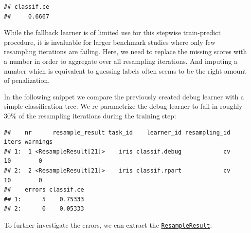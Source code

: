 \documentclass[
]{scrbook}
\newenvironment{Shaded}{\begin{snugshade}}{\end{snugshade}}
\newcommand{\AttributeTok}[1]{\textcolor[rgb]{0.77,0.63,0.00}{#1}}
\newcommand{\ConstantTok}[1]{\textcolor[rgb]{0.00,0.00,0.00}{#1}}
\newcommand{\FloatTok}[1]{\textcolor[rgb]{0.00,0.00,0.81}{#1}}
\newcommand{\FunctionTok}[1]{\textcolor[rgb]{0.00,0.00,0.00}{#1}}
\newcommand{\NormalTok}[1]{#1}
\newcommand{\OtherTok}[1]{\textcolor[rgb]{0.56,0.35,0.01}{#1}}
\newcommand{\SpecialCharTok}[1]{\textcolor[rgb]{0.00,0.00,0.00}{#1}}
\newcommand{\StringTok}[1]{\textcolor[rgb]{0.31,0.60,0.02}{#1}}
\renewenvironment{Shaded} {\begin{snugshade}\small} {\end{snugshade}}
\begin{document}
\begin{verbatim}
## classif.ce 
##     0.6667
\end{verbatim}

While the fallback learner is of limited use for this stepwise train-predict procedure, it is invaluable for larger benchmark studies where only few resampling iterations are failing.
Here, we need to replace the missing scores with a number in order to aggregate over all resampling iterations.
And imputing a number which is equivalent to guessing labels often seems to be the right amount of penalization.

In the following snippet we compare the previously created debug learner with a simple classification tree.
We re-parametrize the debug learner to fail in roughly 30\% of the resampling iterations during the training step:

\begin{Shaded}
\end{Shaded}

\begin{verbatim}
##    nr      resample_result task_id    learner_id resampling_id iters warnings
## 1:  1 <ResampleResult[21]>    iris classif.debug            cv    10        0
## 2:  2 <ResampleResult[21]>    iris classif.rpart            cv    10        0
##    errors classif.ce
## 1:      5    0.75333
## 2:      0    0.05333
\end{verbatim}

To further investigate the errors, we can extract the \href{https://mlr3.mlr-org.com/reference/ResampleResult.html}{\texttt{ResampleResult}}:

\begin{Shaded}
\end{Shaded}
\end{document}
